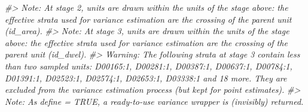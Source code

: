 \documentclass[
]{article}
\newenvironment{Shaded}{\begin{snugshade}}{\end{snugshade}}
\newcommand{\CommentTok}[1]{\textcolor[rgb]{0.56,0.35,0.01}{\textit{#1}}}
\begin{document}
\begin{Shaded}
\begin{Highlighting}[]
\CommentTok{\#\textgreater{} Note: At stage 2, units are drawn within the units of the stage above: the effective strata used for variance estimation are the crossing of the parent unit (id\_area).}
\CommentTok{\#\textgreater{} Note: At stage 3, units are drawn within the units of the stage above: the effective strata used for variance estimation are the crossing of the parent unit (id\_dwel).}
\CommentTok{\#\textgreater{} Warning: The following strata at stage 3 contain less than two sampled units: D00165:1, D00281:1, D00387:1, D00637:1, D00784:1, D01391:1, D02523:1, D02574:1, D02653:1, D03338:1 and 18 more. They are excluded from the variance estimation process (but kept for point estimates).}
\CommentTok{\#\textgreater{} Note: As define = TRUE, a ready{-}to{-}use variance wrapper is (invisibly) returned.}
\end{Highlighting}
\end{Shaded}
\end{document}
